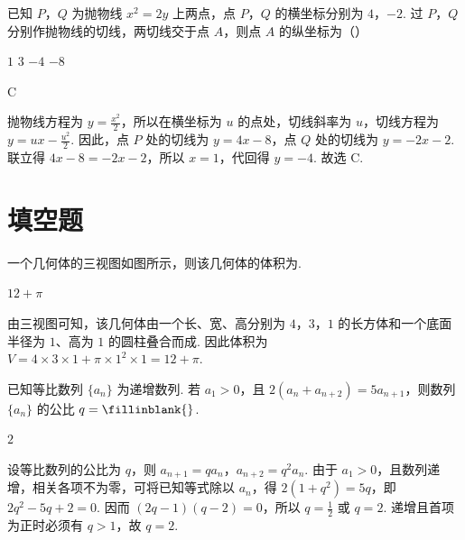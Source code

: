 \begin{problem}
已知 \(P\)，\(Q\) 为抛物线 \(x^{2} = 2y\) 上两点，点 \(P\)，\(Q\) 的横坐标分别为 \(4\)，\(-2\). 过 \(P\)，\(Q\) 分别作抛物线的切线，两切线交于点 \(A\)，则点 \(A\) 的纵坐标为（\quad）

\choices
    {\(1\)}
    {\(3\)}
    {\(-4\)}
    {\(-8\)}
\end{problem}

\begin{answer}
C
\end{answer}

\begin{solution}
抛物线方程为 \(\displaystyle y=\frac{x^2}{2}\)，所以在横坐标为 \(u\) 的点处，切线斜率为 \(u\)，切线方程为 \(\displaystyle y=u x-\frac{u^2}{2}\). 因此，点 \(P\) 处的切线为 \(y=4x-8\)，点 \(Q\) 处的切线为 \(y=-2x-2\). 联立得 \(4x-8=-2x-2\)，所以 \(x=1\)，代回得 \(y=-4\). 故选 C.
\end{solution}

\section{填空题}

\begin{problem}
一个几何体的三视图如图所示，则该几何体的体积为\fillinblank{}.

\end{problem}

\begin{answer}
\(12 + \pi\)
\end{answer}

\begin{solution}
由三视图可知，该几何体由一个长、宽、高分别为 \(4\)，\(3\)，\(1\) 的长方体和一个底面半径为 \(1\)、高为 \(1\) 的圆柱叠合而成. 因此体积为 \(\displaystyle V=4\times3\times1+\pi\times1^2\times1=12+\pi\).
\end{solution}

\begin{problem}
已知等比数列 \(\{a_{n}\}\) 为递增数列. 若 \(a_1 > 0\)，且 \(2(a_n + a_{n+2}) = 5a_{n+1}\)，则数列 \(\{a_n\}\) 的公比 \(q =\fillinblank{}\).
\end{problem}

\begin{answer}
\(2\)
\end{answer}

\begin{solution}
设等比数列的公比为 \(q\)，则 \(a_{n+1}=qa_n\)，\(a_{n+2}=q^2a_n\). 由于 \(a_1>0\)，且数列递增，相关各项不为零，可将已知等式除以 \(a_n\)，得 \(2(1+q^2)=5q\)，即 \(2q^2-5q+2=0\). 因而 \(\left(2q-1\right)\left(q-2\right)=0\)，所以 \(q=\frac12\) 或 \(q=2\). 递增且首项为正时必须有 \(q>1\)，故 \(q=2\).
\end{solution}

